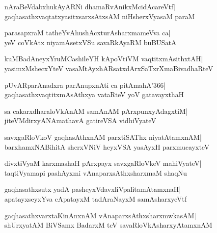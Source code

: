 \documentclass[twoside,12pt,openright]{book}
\newcounter{shloka}[chapter]
\begin{document}
\begin{shloka}%
nAraBeVdabxhukAyARNi dhamaRvAnikxMcidAcareVtf|\\
gaqhasathxvaqtatxyasitxsarxsAtxsAM niHsherxVyasaM paraM
\end{shloka}

\begin{shloka}%
parasapxraM tatheYvAhushAcxturAsharxmameVva ca|\\
yeV coVkAtx niyamAsetxVSu savaRkAyaRM buBUSatA
\end{shloka}

\begin{shloka}%
kuMBadAneyxYruMCashileYH kApoVtiVM vaqtitxmAsithxtAH|\\
yasimxMshecxYteV vasaMtAyxhARsatxdArxSaTxrXmaBivadhaRteV
\end{shloka}

\begin{shloka}%
pUvARparAnadxra parAnupxnAti ca pitAmahA\char'366|\\
gaqhasathxvaqtitxmAsAthxya vataRteV yoV gatavayxthaH
\end{shloka}

\begin{shloka}%
sa cakarxdharaloVkAnAM samAnAM pArxpunxyAdagxtiM|\\
jiteVMdirxyANAmathavA gatireVSA vidhiVyateV
\end{shloka}

\begin{shloka}%
savxgaRloVkoV gaqhasAthxnAM parxtiSAThx niyatAtamxnAM|\\
barxhamxNABihitA sherxVNiV heyxVSA yasAyxH parxmucayxteV
\end{shloka}

\begin{shloka}%
divxtiVyaM karxmashaH pArxpayx savxgaRloVkeV mahiVyateV|\\
taqtiVyamapi pashAyxmi vAnaparxsAthxsharxmaM shaqNu
\end{shloka}

\begin{shloka}%
gaqhasathxsutx yadA pasheyxVdavxliVpalitamAtamxnaH|\\
apatayxseyxYva cApatayxM tadAraNayxM samAsharxyeVtf
\end{shloka}

\begin{shloka}%
gaqhasathxvarxtaKinAnxnAM vAnaparxsAthxsharxmwkasAM|\\
shUrxyatAM BiVSamx BadarxM teV savaRloVkAsharxyAtamxnAM
\end{shloka}
\end{document}
